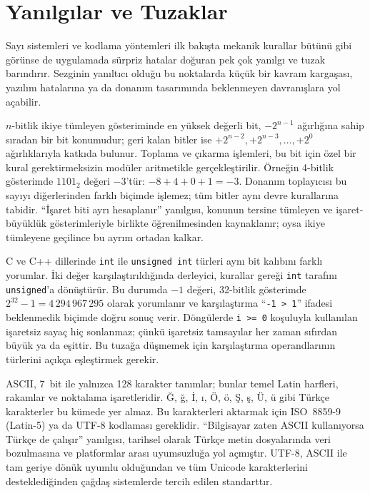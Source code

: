 \section{Yanılgılar ve Tuzaklar}
\label{sec:yanilgilar-tuzaklar-sayi-sistemleri}

Sayı sistemleri ve kodlama yöntemleri ilk bakışta mekanik kurallar bütünü gibi görünse de uygulamada sürpriz hatalar doğuran pek çok yanılgı ve tuzak barındırır. Sezginin yanıltıcı olduğu bu noktalarda küçük bir kavram kargaşası, yazılım hatalarına ya da donanım tasarımında beklenmeyen davranışlara yol açabilir.

$n$-bitlik ikiye tümleyen gösteriminde en yüksek değerli bit, $-2^{n-1}$ ağırlığına sahip sıradan bir bit konumudur; geri kalan bitler ise $+2^{n-2}, +2^{n-3}, \ldots, +2^0$ ağırlıklarıyla katkıda bulunur. Toplama ve çıkarma işlemleri, bu bit için özel bir kural gerektirmeksizin modüler aritmetikle gerçekleştirilir. Örneğin 4-bitlik gösterimde $1101_2$ değeri $-3$'tür: $-8 + 4 + 0 + 1 = -3$. Donanım toplayıcısı bu sayıyı diğerlerinden farklı biçimde işlemez; tüm bitler aynı devre kurallarına tabidir. ``İşaret biti ayrı hesaplanır'' yanılgısı, konunun tersine tümleyen ve işaret-büyüklük gösterimleriyle birlikte öğrenilmesinden kaynaklanır; oysa ikiye tümleyene geçilince bu ayrım ortadan kalkar.

C ve C++ dillerinde \texttt{int} ile \texttt{unsigned int} türleri aynı bit kalıbını farklı yorumlar. İki değer karşılaştırıldığında derleyici, kurallar gereği \texttt{int} tarafını \texttt{unsigned}'a dönüştürür. Bu durumda $-1$ değeri, 32-bitlik gösterimde $2^{32}-1 = 4\,294\,967\,295$ olarak yorumlanır ve karşılaştırma ``\texttt{-1 > 1}'' ifadesi beklenmedik biçimde doğru sonuç verir. Döngülerde \texttt{i >= 0} koşuluyla kullanılan işaretsiz sayaç hiç sonlanmaz; çünkü işaretsiz tamsayılar her zaman sıfırdan büyük ya da eşittir. Bu tuzağa düşmemek için karşılaştırma operandlarının türlerini açıkça eşleştirmek gerekir.

ASCII, 7~bit ile yalnızca 128 karakter tanımlar; bunlar temel Latin harfleri, rakamlar ve noktalama işaretleridir. Ğ, ğ, İ, ı, Ö, ö, Ş, ş, Ü, ü gibi Türkçe karakterler bu kümede yer almaz. Bu karakterleri aktarmak için ISO~8859-9 (Latin-5) ya da UTF-8 kodlaması gereklidir. ``Bilgisayar zaten ASCII kullanıyorsa Türkçe de çalışır'' yanılgısı, tarihsel olarak Türkçe metin dosyalarında veri bozulmasına ve platformlar arası uyumsuzluğa yol açmıştır. UTF-8, ASCII ile tam geriye dönük uyumlu olduğundan ve tüm Unicode karakterlerini desteklediğinden çağdaş sistemlerde tercih edilen standarttır.

